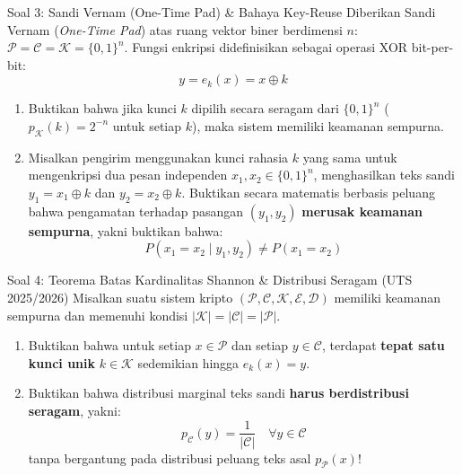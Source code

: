 \documentclass[11pt,a4paper]{article}
\begin{document}
\vspace{0.4cm}

\begin{soalbox}{Soal 3: Sandi Vernam (One-Time Pad) \& Bahaya Key-Reuse}
Diberikan Sandi Vernam (\textit{One-Time Pad}) atas ruang vektor biner berdimensi $n$: $\mathcal{P} = \mathcal{C} = \mathcal{K} = \{0, 1\}^n$. Fungsi enkripsi didefinisikan sebagai operasi XOR bit-per-bit:
\[
y = e_k(x) = x \oplus k
\]
\begin{enumerate}[label=(\alph*)]
    \item Buktikan bahwa jika kunci $k$ dipilih secara seragam dari $\{0, 1\}^n$ ($p_{\mathcal{K}}(k) = 2^{-n}$ untuk setiap $k$), maka sistem memiliki keamanan sempurna.
    \item Misalkan pengirim menggunakan kunci rahasia $k$ yang sama untuk mengenkripsi dua pesan independen $x_1, x_2 \in \{0, 1\}^n$, menghasilkan teks sandi $y_1 = x_1 \oplus k$ dan $y_2 = x_2 \oplus k$. Buktikan secara matematis berbasis peluang bahwa pengamatan terhadap pasangan $(y_1, y_2)$ \textbf{merusak keamanan sempurna}, yakni buktikan bahwa:
    \[
    P(x_1 = x_2 \mid y_1, y_2) \ne P(x_1 = x_2)
    \]
\end{enumerate}
\end{soalbox}

\newpage

\begin{soalbox}{Soal 4: Teorema Batas Kardinalitas Shannon \& Distribusi Seragam (UTS 2025/2026)}
Misalkan suatu sistem kripto $(\mathcal{P}, \mathcal{C}, \mathcal{K}, \mathcal{E}, \mathcal{D})$ memiliki keamanan sempurna dan memenuhi kondisi $|\mathcal{K}| = |\mathcal{C}| = |\mathcal{P}|$.
\begin{enumerate}[label=(\alph*)]
    \item Buktikan bahwa untuk setiap $x \in \mathcal{P}$ dan setiap $y \in \mathcal{C}$, terdapat \textbf{tepat satu kunci unik} $k \in \mathcal{K}$ sedemikian hingga $e_k(x) = y$.
    \item Buktikan bahwa distribusi marginal teks sandi \textbf{harus berdistribusi seragam}, yakni:
    \[
    p_{\mathcal{C}}(y) = \frac{1}{|\mathcal{C}|} \quad \forall y \in \mathcal{C}
    \]
    tanpa bergantung pada distribusi peluang teks asal $p_{\mathcal{P}}(x)$!
\end{enumerate}
\end{soalbox}

\vspace{0.4cm}
\end{document}
